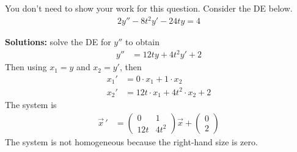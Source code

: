 \ifnum {}
\question[2] You don't need to show your work for this question. Consider the DE below.
\begin{align*}
    2y'' - 8t^2y' - 24ty = 4
\end{align*}
\ifnum {} {\color{DarkBlue} 
\textbf{Solutions:} solve the DE for $y''$ to obtain
\begin{align}
    y'' &= 12ty + 4t^2y' + 2
\end{align}
Then using $x_1 = y$ and $x_2 = y'$, then 
\begin{align}
    x_1 ' &= 0\cdot x_1 + 1\cdot x_2 \\
    x_2' &=  12t\cdot x_1 + 4t^2 \cdot x_2 + 2
\end{align}
The system is
\begin{align}
    \vec x \, ' &= \begin{pmatrix} 0&1\\12t & 4t^2 \end{pmatrix} \vec x + \begin{pmatrix} 0\\2\end{pmatrix}
\end{align}
The system is not homogeneous because the right-hand size is zero.  
} 
\else 
\fi
\fi 




